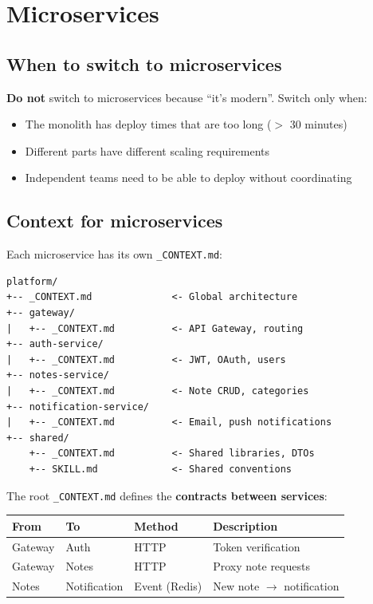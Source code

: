 \section{Microservices}

\subsection{When to switch to microservices}

\textbf{Do not} switch to microservices because ``it's modern''. Switch only when:
\begin{itemize}
  \item The monolith has deploy times that are too long ($>$ 30 minutes)
  \item Different parts have different scaling requirements
  \item Independent teams need to be able to deploy without coordinating
\end{itemize}

\subsection{Context for microservices}

Each microservice has its own \texttt{\_CONTEXT.md}:

\begin{lstlisting}[language={}]
platform/
+-- _CONTEXT.md              <- Global architecture
+-- gateway/
|   +-- _CONTEXT.md          <- API Gateway, routing
+-- auth-service/
|   +-- _CONTEXT.md          <- JWT, OAuth, users
+-- notes-service/
|   +-- _CONTEXT.md          <- Note CRUD, categories
+-- notification-service/
|   +-- _CONTEXT.md          <- Email, push notifications
+-- shared/
    +-- _CONTEXT.md          <- Shared libraries, DTOs
    +-- SKILL.md             <- Shared conventions
\end{lstlisting}

The root \texttt{\_CONTEXT.md} defines the \textbf{contracts between services}:

\begin{center}
\begin{tabularx}{\textwidth}{l l l X}
\toprule
\textbf{From} & \textbf{To} & \textbf{Method} & \textbf{Description} \\
\midrule
Gateway & Auth & HTTP & Token verification \\
Gateway & Notes & HTTP & Proxy note requests \\
Notes & Notification & Event (Redis) & New note $\rightarrow$ notification \\
\bottomrule
\end{tabularx}
\end{center}

